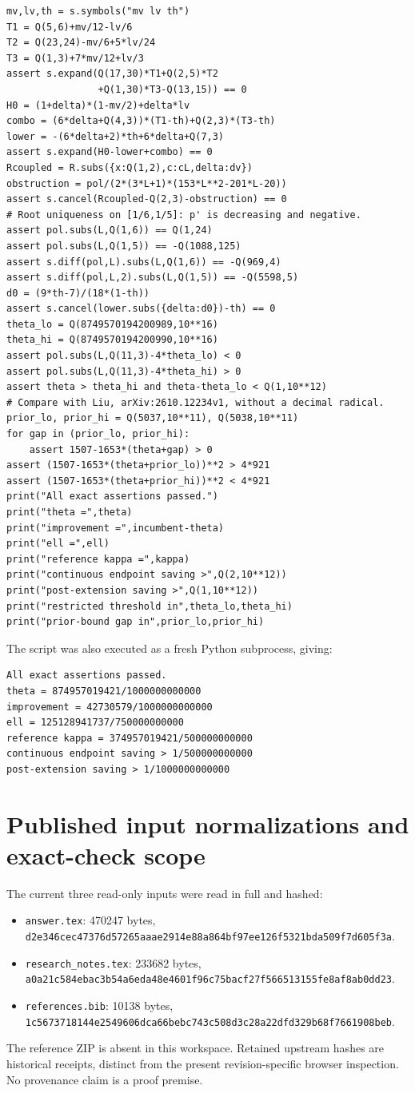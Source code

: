 \documentclass[12pt]{article}
\begin{document}
\begin{verbatim}
mv,lv,th = s.symbols("mv lv th")
T1 = Q(5,6)+mv/12-lv/6
T2 = Q(23,24)-mv/6+5*lv/24
T3 = Q(1,3)+7*mv/12+lv/3
assert s.expand(Q(17,30)*T1+Q(2,5)*T2
                +Q(1,30)*T3-Q(13,15)) == 0
H0 = (1+delta)*(1-mv/2)+delta*lv
combo = (6*delta+Q(4,3))*(T1-th)+Q(2,3)*(T3-th)
lower = -(6*delta+2)*th+6*delta+Q(7,3)
assert s.expand(H0-lower+combo) == 0
Rcoupled = R.subs({x:Q(1,2),c:cL,delta:dv})
obstruction = pol/(2*(3*L+1)*(153*L**2-201*L-20))
assert s.cancel(Rcoupled-Q(2,3)-obstruction) == 0
# Root uniqueness on [1/6,1/5]: p' is decreasing and negative.
assert pol.subs(L,Q(1,6)) == Q(1,24)
assert pol.subs(L,Q(1,5)) == -Q(1088,125)
assert s.diff(pol,L).subs(L,Q(1,6)) == -Q(969,4)
assert s.diff(pol,L,2).subs(L,Q(1,5)) == -Q(5598,5)
d0 = (9*th-7)/(18*(1-th))
assert s.cancel(lower.subs({delta:d0})-th) == 0
theta_lo = Q(8749570194200989,10**16)
theta_hi = Q(8749570194200990,10**16)
assert pol.subs(L,Q(11,3)-4*theta_lo) < 0
assert pol.subs(L,Q(11,3)-4*theta_hi) > 0
assert theta > theta_hi and theta-theta_lo < Q(1,10**12)
# Compare with Liu, arXiv:2610.12234v1, without a decimal radical.
prior_lo, prior_hi = Q(5037,10**11), Q(5038,10**11)
for gap in (prior_lo, prior_hi):
    assert 1507-1653*(theta+gap) > 0
assert (1507-1653*(theta+prior_lo))**2 > 4*921
assert (1507-1653*(theta+prior_hi))**2 < 4*921
print("All exact assertions passed.")
print("theta =",theta)
print("improvement =",incumbent-theta)
print("ell =",ell)
print("reference kappa =",kappa)
print("continuous endpoint saving >",Q(2,10**12))
print("post-extension saving >",Q(1,10**12))
print("restricted threshold in",theta_lo,theta_hi)
print("prior-bound gap in",prior_lo,prior_hi)

\end{verbatim}
The script was also executed as a fresh Python subprocess, giving:
\begin{verbatim}
All exact assertions passed.
theta = 874957019421/1000000000000
improvement = 42730579/1000000000000
ell = 125128941737/750000000000
reference kappa = 374957019421/500000000000
continuous endpoint saving > 1/500000000000
post-extension saving > 1/1000000000000
\end{verbatim}


\section{Published input normalizations and exact-check scope}
The current three read-only inputs were read in full and hashed:
\begin{itemize}
\item \texttt{answer.tex}: 470247 bytes,
\nolinkurl{d2e346cec47376d57265aaae2914e88a864bf97ee126f5321bda509f7d605f3a}.
\item \texttt{research\_notes.tex}: 233682 bytes,
\nolinkurl{a0a21c584ebac3b54a6eda48e4601f96c75bacf27f566513155fe8af8ab0dd23}.
\item \texttt{references.bib}: 10138 bytes,
\nolinkurl{1c5673718144e2549606dca66bebc743c508d3c28a22dfd329b68f7661908beb}.
\end{itemize}
The reference ZIP is absent in this workspace.  Retained upstream hashes
are historical receipts, distinct from the present revision-specific
browser inspection.  No provenance claim is a proof premise.
\end{document}

